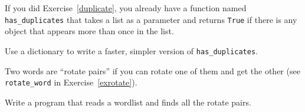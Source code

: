 \documentclass[10pt]{book}
\begin{document}
\begin{ex}

If you did Exercise~\ref{duplicate}, you already have
a function named \verb"has_duplicates" that takes a list
as a parameter and returns {\tt True} if there is any object
that appears more than once in the list.

Use a dictionary to write a faster, simpler version of
\verb"has_duplicates".
\end{ex}


\begin{ex}
\label{exrotatepairs}


Two words are ``rotate pairs'' if you can rotate one of them
and get the other (see \verb"rotate_word" in Exercise~\ref{exrotate}).

Write a program that reads a wordlist and finds all the rotate
pairs.
\end{ex}
\end{document}
